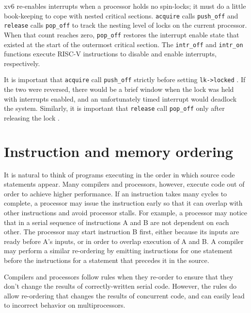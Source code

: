 xv6 re-enables interrupts when a processor holds no spin-locks; it must
do a little book-keeping to cope with nested critical sections.
\lstinline{acquire}
calls
\lstinline{push_off}
and
\lstinline{release}
calls
\lstinline{pop_off}
to track the nesting level of locks on the current processor.
When that count reaches zero,
\lstinline{pop_off} 
restores the interrupt enable state that existed 
at the start of the outermost critical section.
The
\lstinline{intr_off}
and
\lstinline{intr_on}
functions execute RISC-V instructions to disable and enable
interrupts, respectively.

It is important that
\lstinline{acquire}
call
\lstinline{push_off}
strictly before setting
\lstinline{lk->locked}
.
If the two were reversed, there would be
a brief window when the lock
was held with interrupts enabled, and
an unfortunately timed interrupt would deadlock the system.
Similarly, it is important that
\lstinline{release}
call
\lstinline{pop_off}
only after 
releasing the lock
.
\section{Instruction and memory ordering}

It is natural to think of programs executing in the order
in which source code statements appear.
Many
compilers and processors, however, execute code out of order
to achieve
higher performance.  If an instruction takes many cycles to complete,
a processor may issue the instruction early so that it can
overlap with other instructions and avoid processor stalls. For
example, a processor may notice that in a serial sequence of
instructions A and B are not dependent on each other.
The processor may start instruction B first, either because its
inputs are ready before A's inputs, or in order to overlap
execution of A and B.
A compiler may perform a similar re-ordering by emitting instructions
for one statement before the instructions for a statement that precedes it
in the source.

Compilers and processors follow rules when they re-order to
ensure that they don't change the results of correctly-written
serial code.
However, the rules do allow re-ordering that
changes the results of concurrent code,
and can easily lead to incorrect behavior on multiprocessors.

